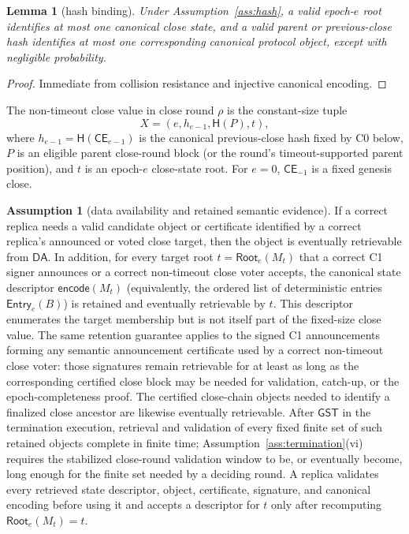 \documentclass[11pt]{article}
\newtheorem{lemma}[theorem]{Lemma}
\theoremstyle{definition}
\newtheorem{assumption}[theorem]{Assumption}
\theoremstyle{remark}
\newcommand{\CE}{\mathsf{CE}}
\newcommand{\DA}{\mathsf{DA}}
\newcommand{\GST}{\mathsf{GST}}
\newcommand{\Root}{\mathsf{Root}}
\newcommand{\Entry}{\mathsf{Entry}}
\newcommand{\hash}{\mathsf{H}}
\begin{document}
\begin{lemma}[hash binding]
\label{lem:root-binding}
Under Assumption~\ref{ass:hash}, a valid epoch-$e$ root identifies at most one canonical close state, and a valid parent or previous-close hash identifies at most one corresponding canonical protocol object, except with negligible probability.
\end{lemma}

\begin{proof}
Immediate from collision resistance and injective canonical encoding.
\end{proof}

The non-timeout close value in close round $\rho$ is the constant-size tuple
\begin{equation}
  X=(e,h_{e-1},\hash(P),t),
  \label{eq:close-block}
\end{equation}
where $h_{e-1}=\hash(\CE_{e-1})$ is the canonical previous-close hash fixed by C0 below, $P$ is an eligible parent close-round block (or the round's timeout-supported parent position), and $t$ is an epoch-$e$ close-state root. For $e=0$, $\CE_{-1}$ is a fixed genesis close.

\begin{assumption}[data availability and retained semantic evidence]
\label{ass:da}
If a correct replica needs a valid candidate object or certificate identified by a correct replica's announced or voted close target, then the object is eventually retrievable from $\DA$. In addition, for every target root $t=\Root_e(M_t)$ that a correct C1 signer announces or a correct non-timeout close voter accepts, the canonical state descriptor $\mathsf{encode}(M_t)$ (equivalently, the ordered list of deterministic entries $\Entry_e(B)$) is retained and eventually retrievable by $t$. This descriptor enumerates the target membership but is not itself part of the fixed-size close value. The same retention guarantee applies to the signed C1 announcements forming any semantic announcement certificate used by a correct non-timeout close voter: those signatures remain retrievable for at least as long as the corresponding certified close block may be needed for validation, catch-up, or the epoch-completeness proof. The certified close-chain objects needed to identify a finalized close ancestor are likewise eventually retrievable. After $\GST$ in the termination execution, retrieval and validation of every fixed finite set of such retained objects complete in finite time; Assumption~\ref{ass:termination}(vi) requires the stabilized close-round validation window to be, or eventually become, long enough for the finite set needed by a deciding round. A replica validates every retrieved state descriptor, object, certificate, signature, and canonical encoding before using it and accepts a descriptor for $t$ only after recomputing $\Root_e(M_t)=t$.
\end{assumption}
\end{document}
